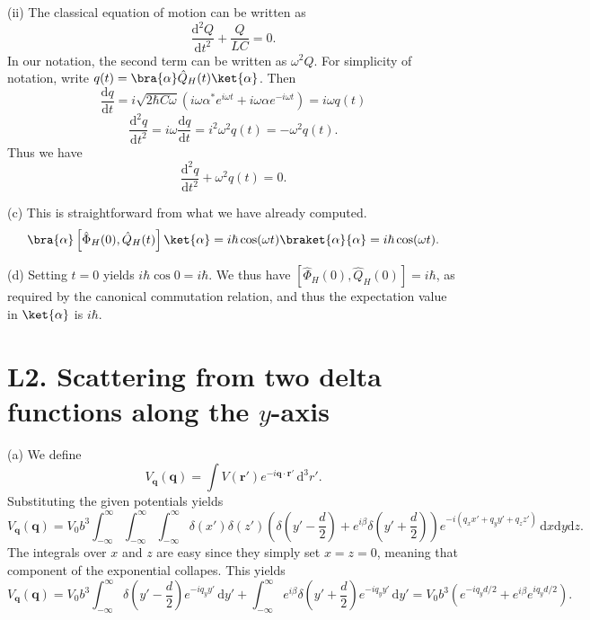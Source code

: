 \documentclass[11pt, letterpaper]{article}
\begin{document}
(ii) The classical equation of motion can be written as
\[
	\frac{\mathrm{d}^2Q}{\mathrm{d}t^2} +\frac{Q}{LC} =0
.\]
In our notation, the second term can be written as $\omega ^2 Q$. For simplicity of notation, write $q(t)=\bra{\alpha }\hat{Q} _H(t)\ket{\alpha }$. Then
\[
	\frac{\mathrm{d}q}{\mathrm{d}t} =i\sqrt{2\hbar C\omega } \left( i\omega \alpha ^* e^{i\omega t} +i\omega \alpha e^{-i\omega t}  \right) = i\omega q(t)
\]
\[
	\frac{\mathrm{d}^2q}{\mathrm{d}t^2} =i\omega \frac{\mathrm{d}q}{\mathrm{d}t} =i^2\omega ^2q(t)=-\omega ^2q(t)
.\]
Thus we have
\[
	\frac{\mathrm{d}^2q}{\mathrm{d}t^2} +\omega ^2q(t)=0
.\]

(c) This is straightforward from what we have already computed.
\[
	\bra{\alpha }\left[ \hat{\Phi }_H(0), \hat{Q} _H(t) \right] \ket{\alpha }=i\hbar \cos (\omega t)\braket{\alpha }{\alpha }=i\hbar \cos (\omega t)
.\]

(d) Setting $t=0$ yields $i\hbar \cos 0=i\hbar $. We thus have $[\hat{\Phi }_H(0), \hat{Q}_H(0)]=i\hbar $, as required by the canonical commutation relation, and thus the expectation value in $\ket{\alpha }$ is $i\hbar $.


\section{L2. Scattering from two delta functions along the $y$-axis}

(a) We define
\[
	V_\mathbf{q} (\mathbf{q} )=\int V(\mathbf{r} ')e^{-i \mathbf{q}\cdot \mathbf{r} '}  \,\mathrm{d} ^3r'
.\]
Substituting the given potentials yields
\[
	V_\mathbf{q} (\mathbf{q} )=V_0b^3 \int_{-\infty }^{\infty }\int_{-\infty }^{\infty }\int_{-\infty }^{\infty } \delta (x')\delta (z')\left( \delta \left( y'-\frac{d}{2}  \right) +e^{i\beta } \delta \left( y'+\frac{d}{2}  \right)  \right) e^{-i(q_xx'+q_yy'+q_zz')}  \,\mathrm{d} x \mathrm{d} y\mathrm{d} z
.\]
The integrals over $x$ and $z$ are easy since they simply set $x=z=0$, meaning that component of the exponential collapes. This yields
\[
	V_\mathbf{q} (\mathbf{q} )=V_0b^3\int_{-\infty }^{\infty } \delta \left( y'-\frac{d}{2}  \right) e^{-iq_yy'}  \,\mathrm{d} y'+\int_{-\infty }^{\infty } e^{i\beta } \delta \left( y'+\frac{d}{2}  \right) e^{-iq_yy'}  \,\mathrm{d} y'=V_0b^3\left( e^{-iq_yd/2} +e^{i\beta } e^{iq_yd/2}  \right) 
.\]
\end{document}
